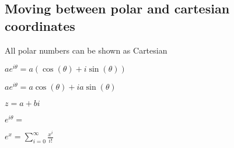 
\subsection{Moving between polar and cartesian coordinates}

All polar numbers can be shown as Cartesian

\(ae^{i\theta }=a(\cos(\theta )+i\sin(\theta ))\)

\(ae^{i\theta }=a\cos(\theta )+ia\sin(\theta )\)

\(z=a+bi\)

\(e^{i\theta }=\)

\(e^x=\sum^{\infty }_{i=0} \frac{x^i}{i!}\)

